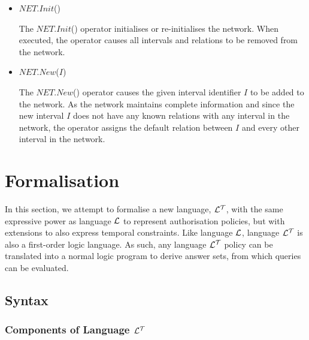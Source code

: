 \documentclass[11pt]{report}
\begin{document}
        \begin{itemize}
          \item
            $NET.Init$()

            The $NET.Init$() operator initialises or re-initialises the
            network. When executed, the operator causes all intervals and
            relations to be removed from the network.

          \item
            $NET.New$($I$)

            The $NET.New$() operator causes the given interval identifier $I$
            to be added to the network. As the network maintains complete
            information and since the new interval $I$ does not have any known
            relations with any interval in the network, the operator assigns
            the default relation between $I$ and every other interval in the
            network.
        \end{itemize}

    \section{Formalisation}

      In this section, we attempt to formalise a new language, ${\cal L^T}$,
      with the same expressive power as language ${\cal L}$ to represent
      authorisation policies, but with extensions to also express temporal
      constraints. Like language ${\cal L}$, language ${\cal L^T}$ is also a
      first-order logic language. As such, any language ${\cal L^T}$ policy
      can be translated into a normal logic program to derive answer sets,
      from which queries can be evaluated.

      \subsection{Syntax}

        \subsubsection{Components of Language ${\cal L^T}$}
\end{document}
